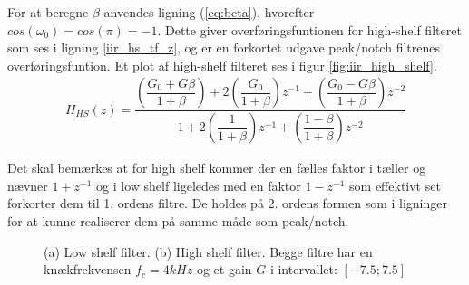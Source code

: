      For at beregne $\beta$ anvendes ligning (\ref{eq:beta}), hvorefter $cos(\omega_0) = cos(\pi) = -1$. Dette giver overføringsfuntionen for high-shelf filteret som ses i ligning \ref{iir_hs_tf_z}, og er en forkortet udgave peak/notch filtrenes overføringsfuntion. Et plot af high-shelf filteret ses i figur \ref{fig:iir_high_shelf}.
     \begin{align}
     H_{HS}(z) = \dfrac{\left(\dfrac{G_0 + G \beta}{1 + \beta} \right)+ 2 \left(\dfrac{G_0 }{1 +\beta} \right)z^{-1} + \left(\dfrac{ G_0 - G \beta}{1 + \beta }\right) z^{-2}}{1 + 2 \left(\dfrac{1}{1 + \beta}\right)z^{-1} + \left( \dfrac{1 - \beta}{1 + \beta} \right) z^{-2}}\label{iir_hs_tf_z}
     \end{align}

     Det skal bemærkes at for high shelf kommer der en fælles faktor i tæller og nævner $1 + z^{-1}$ og i low shelf ligeledes med en faktor $1 - z^{-1}$  
     som effektivt set forkorter dem til 1. ordens filtre. De holdes på 2. ordens formen som i ligninger for at kunne realiserer dem på samme måde som peak/notch.


\begin{figure}[h]
	\centering
	\caption{(a) Low shelf filter. (b) High shelf filter. \newline Begge filtre har en knækfrekvensen $f_c = 4kHz$ og et gain $G$ i intervallet: $[-7.5 ; 7.5]$}
\end{figure}
\FloatBlock



